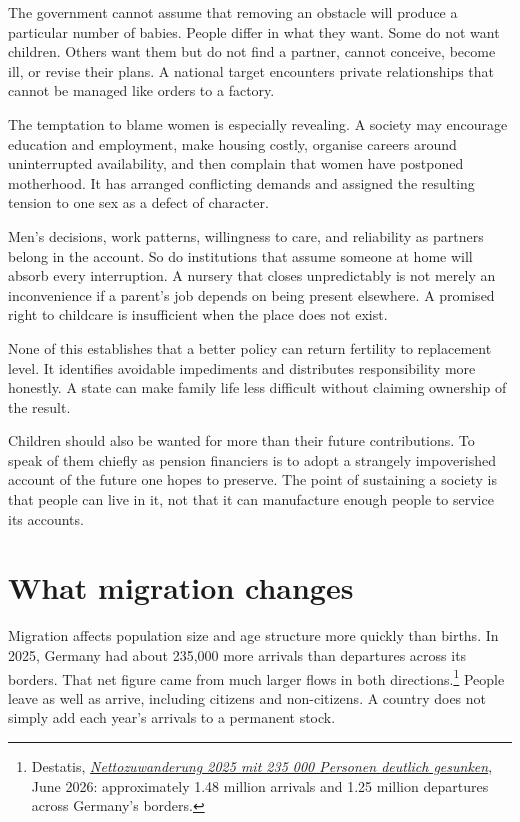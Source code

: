 \documentclass[12pt,a4paper]{book}
\begin{document}
The government cannot assume that removing an obstacle will produce a particular number of babies. People differ in what they want. Some do not want children. Others want them but do not find a partner, cannot conceive, become ill, or revise their plans. A national target encounters private relationships that cannot be managed like orders to a factory.

The temptation to blame women is especially revealing. A society may encourage education and employment, make housing costly, organise careers around uninterrupted availability, and then complain that women have postponed motherhood. It has arranged conflicting demands and assigned the resulting tension to one sex as a defect of character.

Men's decisions, work patterns, willingness to care, and reliability as partners belong in the account. So do institutions that assume someone at home will absorb every interruption. A nursery that closes unpredictably is not merely an inconvenience if a parent's job depends on being present elsewhere. A promised right to childcare is insufficient when the place does not exist.

None of this establishes that a better policy can return fertility to replacement level. It identifies avoidable impediments and distributes responsibility more honestly. A state can make family life less difficult without claiming ownership of the result.

Children should also be wanted for more than their future contributions. To speak of them chiefly as pension financiers is to adopt a strangely impoverished account of the future one hopes to preserve. The point of sustaining a society is that people can live in it, not that it can manufacture enough people to service its accounts.

\section*{What migration changes}

Migration affects population size and age structure more quickly than births. In 2025, Germany had about 235,000 more arrivals than departures across its borders. That net figure came from much larger flows in both directions.\footnote{Destatis, \href{https://www.destatis.de/DE/Presse/Pressemitteilungen/2026/06/PD26_184_12411.html}{\emph{Nettozuwanderung 2025 mit 235 000 Personen deutlich gesunken}}, June 2026: approximately 1.48 million arrivals and 1.25 million departures across Germany's borders.} People leave as well as arrive, including citizens and non-citizens. A country does not simply add each year's arrivals to a permanent stock.
\end{document}
